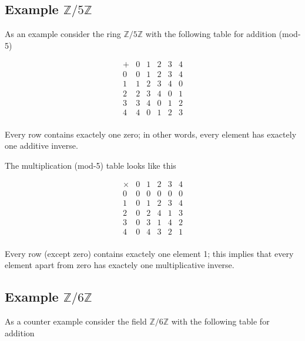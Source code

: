 
\subsection{\texorpdfstring{Example
\(\mathbb{Z}/5\mathbb{Z}\)}{Example \textbackslash{}mathbb\{Z\}/5\textbackslash{}mathbb\{Z\}}}\label{example-mathbbz5mathbbz}

As an example consider the ring \(\mathbb{Z}/5\mathbb{Z}\) with the
following table for addition (mod-5)

\[
\begin{array}{c|ccccc}
+  & 0 & 1 & 2 & 3 & 4 \\
\hline
0  & 0 & 1 & 2 & 3 & 4 \\
1  & 1 & 2 & 3 & 4 & 0 \\
2  & 2 & 3 & 4 & 0 & 1 \\
3  & 3 & 4 & 0 & 1 & 2 \\
4  & 4 & 0 & 1 & 2 & 3 \\
\end{array}
\]

Every row contains exactely one zero; in other words, every element has
exactely one additive inverse.

The multiplication (mod-5) table looks like this

\[
\begin{array}{c|ccccc}
\times  & 0 & 1 & 2 & 3 & 4 \\
\hline
      0 & 0 & 0 & 0 & 0 & 0 \\
      1 & 0 & 1 & 2 & 3 & 4 \\
      2 & 0 & 2 & 4 & 1 & 3 \\
      3 & 0 & 3 & 1 & 4 & 2 \\
      4 & 0 & 4 & 3 & 2 & 1 \\
\end{array}
\]

Every row (except zero) contains exactely one element 1; this implies
that every element apart from zero has exactely one multiplicative
inverse.

\subsection{\texorpdfstring{Example
\(\mathbb{Z}/6\mathbb{Z}\)}{Example \textbackslash{}mathbb\{Z\}/6\textbackslash{}mathbb\{Z\}}}\label{example-mathbbz6mathbbz}

As a counter example consider the field \(\mathbb{Z}/6\mathbb{Z}\) with
the following table for addition


